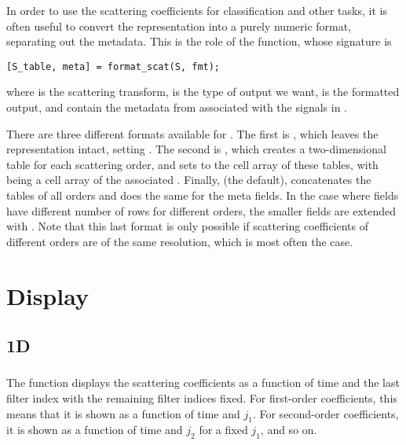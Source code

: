 \documentclass{article}
\begin{document}
In order to use the scattering coefficients for classification and other tasks, it is often useful to convert the representation into a purely numeric format, separating 
out the metadata. This is the role of the  function, whose signature is
\begin{lstlisting}
[S_table, meta] = format_scat(S, fmt);
\end{lstlisting}
where  is the scattering transform,  is the type of output we want,  is the formatted output, and  contain the metadata 
from  associated with the signals in .

There are three different formats available for . The first is , which leaves the representation intact, setting . The second is , which creates
 a two-dimensional table for each scattering order, and sets  to the cell array of these tables, with  being a cell array of the associated . Finally,  (the default), concatenates the tables of all orders and does the same for the meta fields. In the case where  fields have different number of rows for different orders, the smaller fields are extended with . Note that this last format is only possible if scattering coefficients of different orders are of the same resolution, which is most often the case.

\section{Display \label{sec:display}}

\subsection{1D}

\subsubsection{}

The  function displays the scattering coefficients as a function of time and the last filter index with the remaining filter indices fixed. For first-order coefficients, this means that it is shown as a function of time and $j_1$. For second-order coefficients, it is shown as a function of time and $j_2$ for a fixed $j_1$, and so on.
\end{document}
